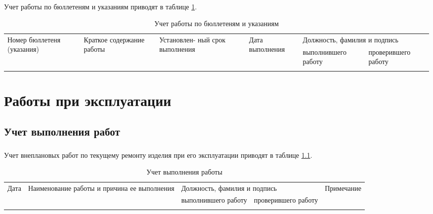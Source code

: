 \paragraph{} Учет работы по бюллетеням и указаниям приводят в таблице \ref{tab:task_work}.

	\begin{small}
	\begin{longtable}{|p{2cm}|p{2cm}|p{3cm}|p{2cm}|p{3cm}|p{3cm}|}
		\caption{\label{tab:task_work} Учет работы по бюллетеням и указаниям}\\ \hline

	\multirow{2}{3cm}{Номер бюллетеня (указания)} & \multirow{2}{3cm}{Краткое содержание работы} & \multirow{2}{3cm}{Установлен- ный срок выполнения} & \multirow{2}{3cm}{Дата выполнения} & \multicolumn{2}{p{6cm}|}{Должность, фамилия и подпись} \\ \cline{5-6} 
	&  &  &  & выполнившего работу & проверившего работу \\ \hline
	
 	\rule{0cm}{20cm}& & & & & \\	\hline
	\end{longtable}
	\end{small}




\chapter{Работы при эксплуатации}

\section{Учет выполнения работ}
	
\paragraph{} Учет внеплановых работ по текущему ремонту изделия при его эксплуатации приводят в таблице \ref{tab:surprise_service}.

		\begin{small}
		\begin{longtable}{|p{1.5cm}|p{5cm}|p{3cm}|p{3cm}|p{3cm}|}
			\caption{\label{tab:surprise_service} Учет выполнения работы}\\ \hline
			
			\multirow{2}{1cm}{Дата} & \multirow{2}{5cm}{Наименование работы и причина ее выполнения} & \multicolumn{2}{p{6cm}|}{Должность, фамилия и подпись} & \multirow{2}{3cm}{Примечание} \\ \cline{3-4}
			&  & выполнившего работу & проверившего работу &  \\ \hline

			 \rule{0cm}{19cm}& & & & \\ \hline
		\end{longtable}
		\end{small}

